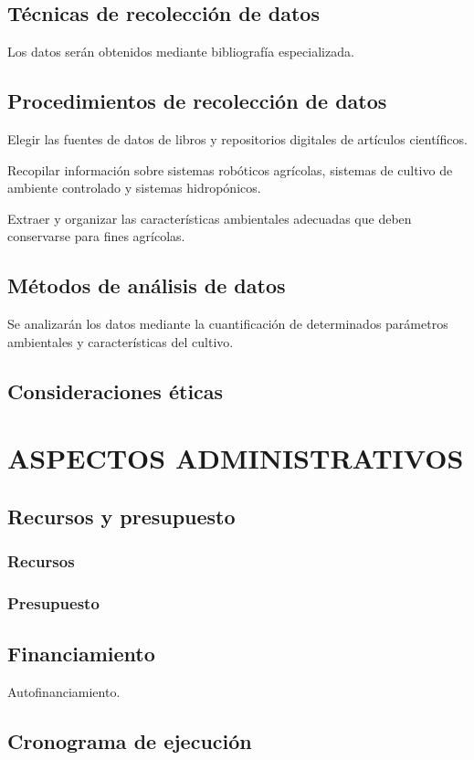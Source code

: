 \documentclass{report}
\begin{document}
\section{Técnicas de recolección de datos}
Los datos serán obtenidos mediante bibliografía especializada.
\section{Procedimientos de recolección de datos}
Elegir las fuentes de datos de libros y repositorios digitales de artículos
científicos.

Recopilar información sobre sistemas robóticos agrícolas, sistemas de cultivo de
ambiente controlado y sistemas hidropónicos.

Extraer y organizar las características ambientales adecuadas que deben
conservarse para fines agrícolas.
\section{Métodos de análisis de datos}
Se analizarán los datos mediante la cuantificación de determinados parámetros
ambientales y características del cultivo.
\section{Consideraciones éticas}

\chapter{ASPECTOS ADMINISTRATIVOS}
\section{Recursos y presupuesto}
\subsection{Recursos}
\subsection{Presupuesto}
\section{Financiamiento}
Autofinanciamiento.
\section{Cronograma de ejecución}
\end{document}
